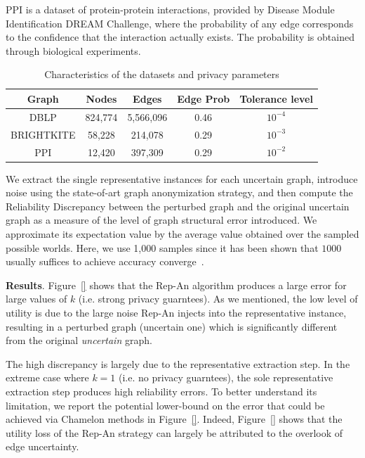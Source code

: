 \textsc{PPI} is a dataset of protein-protein interactions, provided by Disease Module Identification DREAM Challenge, where the probability of any edge corresponds to the confidence that the interaction actually exists.
The probability is obtained through biological experiments.

\begin{table}[t]
    \centering
        \caption{Characteristics of the datasets and privacy parameters}
        \begin{tabular}{|c|c|c|c||c|}
        \hline 
        Graph    & Nodes    & Edges    &Edge Prob    & Tolerance level\\
        \hline  
        DBLP     &824,774   &5,566,096 & 0.46        & $10^{-4}$\\
        \small{BRIGHTKITE} &58,228   & 214,078 &0.29 &$10^{-3}$ \\
        PPI      &12,420   & 397,309  & 0.29         &$10^{-2}$\\
        \hline
        \end{tabular}
        \label{tab:dataset}
\end{table}

We extract the single representative instances for each uncertain graph, introduce noise using the state-of-art graph anonymization strategy, and then compute the Reliability Discrepancy between the perturbed graph and the original uncertain graph as a measure of the level of graph structural error introduced. We approximate its expectation value by the average value obtained over the sampled possible worlds. Here, we use 1,000 samples since it has been shown that $1000$ usually suffices to achieve accuracy converge~\cite{Potamias_K_2010}.

\textbf{Results}. Figure~\ref{} shows that the Rep-An algorithm produces a large error for large values of $k$ (i.e. strong privacy guarntees). As we mentioned, the low level of utility is due to the large noise Rep-An injects into the representative instance, resulting in a perturbed graph (uncertain one) which is significantly different from the original \emph{uncertain} graph. 

The high discrepancy is largely due to the representative extraction step. In the extreme case where $k=1$ (i.e. no privacy guarntees), the sole representative extraction step produces high reliability errors. 
To better understand its limitation, we report the potential lower-bound on the error that could be achieved via Chamelon methods in Figure~\ref{}. Indeed, Figure~\ref{} shows that the utility loss of the Rep-An strategy can largely be attributed to the overlook of edge uncertainty.   




